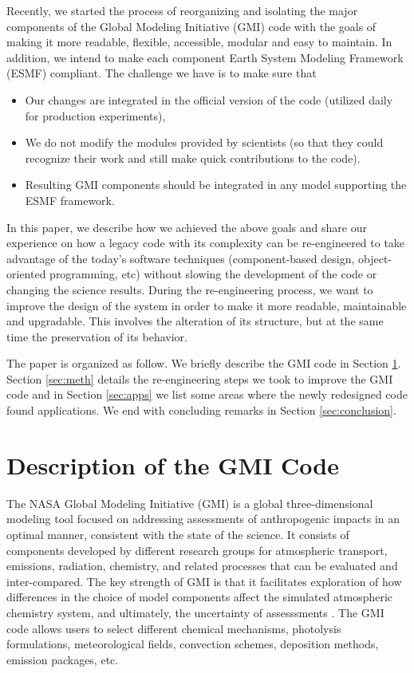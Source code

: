 \documentclass[11pt]{article}
\def\bi{\begin{itemize}}
\def\ei{\end{itemize}}
\begin{document}
Recently, we started the process of reorganizing and isolating 
the major components of the Global Modeling Initiative (GMI) code
with the goals of making it more readable, flexible, accessible, 
modular and easy to maintain. 
In addition, we intend to make each component  Earth System Modeling Framework (ESMF)
\cite{Hill-etal04} compliant.
The challenge we have is to make sure that 
\bi
\item Our changes are integrated in the official version of the code 
      (utilized daily for production experiments),
\item We do not modify the modules provided by scientists (so that they could
      recognize their work and still make quick contributions to the code).
\item Resulting GMI components should be integrated in any model supporting the 
      ESMF framework.
\ei
%

In this paper, we describe how we achieved the above goals and
share our experience on how a legacy code with its complexity can be
re-engineered to take advantage of the today's software techniques
(component-based design, object-oriented programming, etc) without
slowing the development of the code or changing the science results.
During the re-engineering process, we want to improve the design of the
system in order to make it more readable, maintainable and upgradable.
This involves the alteration of its structure, but at the same time the
preservation of its behavior.

The paper is organized as follow. We briefly describe the GMI
code in Section \ref{sec:gmiCode}.
Section \ref{sec:meth} details the re-engineering steps we took
to improve the GMI code and in Section \ref{sec:apps} we list
some areas where the newly redesigned code found applications.
We end with concluding remarks in Section \ref{sec:conclusion}.


\section{Description of the GMI Code} \label{sec:gmiCode}
The NASA Global Modeling Initiative (GMI) is a global three-dimensional
 modeling tool focused on addressing assessments of anthropogenic impacts in an
optimal manner, consistent with the state of the science.
It consists of components developed by different research groups for 
atmospheric transport, emissions, radiation, chemistry, and related 
processes that can be evaluated and inter-compared. 
The key strength of GMI is that it facilitates exploration of how 
differences in the choice of model components affect the simulated 
atmospheric chemistry system, and ultimately, the uncertainty 
of assesssments \cite{Logan-etal03}.
The GMI code allows users to select different chemical mechanisms,
photolysis formulations, meteorological fields, convection schemes, 
deposition methods, emission packages, etc.
\end{document}
